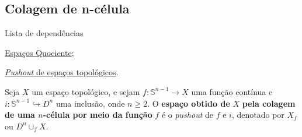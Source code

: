 \subsection{Colagem de n-célula} %
\label{colagem-de-n-celula-def}
\begin{titlemize}{Lista de dependências}
	\item \hyperref[topologia-quociente-def]{Espaços Quociente};\\

    \item \hyperref[pushout-de-espacos-topologicos-def]{\emph{Pushout} de espaços topológicos}.%

\end{titlemize}

\begin{defi}
    Seja $X$ um espaço topológico, e sejam $f:\mathbb{S}^{n-1}\rightarrow X$ uma função contínua e $i:\mathbb{S}^{n-1}\hookrightarrow D^n$ uma inclusão, onde $n\ge 2$. O \textbf{espaço obtido de} $X$ \textbf{pela colagem de uma $n$-célula por meio da função} $f$ é o \emph{pushout} de $f$ e $i$, denotado por $X_f$ ou $D^n\cup_f X$.
\end{defi}

